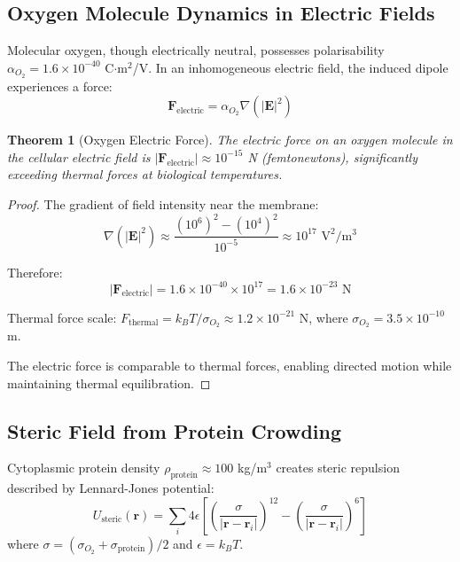 \documentclass[11pt,twocolumn,a4paper]{article}
\newtheorem{theorem}{Theorem}[section]
\theoremstyle{definition}
\theoremstyle{remark}
\begin{document}
\subsection{Oxygen Molecule Dynamics in Electric Fields}

Molecular oxygen, though electrically neutral, possesses polarisability $\alpha_{O_2} = 1.6 \times 10^{-40}$ C$\cdot$m$^2$/V. In an inhomogeneous electric field, the induced dipole experiences a force:
\begin{equation}
\mathbf{F}_{\mathrm{electric}} = \alpha_{O_2} \nabla(|\mathbf{E}|^2)
\label{eq:electric_force_o2}
\end{equation}

\begin{theorem}[Oxygen Electric Force]
\label{thm:o2_electric_force}
The electric force on an oxygen molecule in the cellular electric field is $|\mathbf{F}_{\mathrm{electric}}| \approx 10^{-15}$ N (femtonewtons), significantly exceeding thermal forces at biological temperatures.
\end{theorem}

\begin{proof}
The gradient of field intensity near the membrane:
\begin{equation}
\nabla(|\mathbf{E}|^2) \approx \frac{(10^6)^2 - (10^4)^2}{10^{-5}} \approx 10^{17} \text{ V}^2/\text{m}^3
\end{equation}

Therefore:
\begin{equation}
|\mathbf{F}_{\mathrm{electric}}| = 1.6 \times 10^{-40} \times 10^{17} = 1.6 \times 10^{-23} \text{ N}
\end{equation}

Thermal force scale: $F_{\mathrm{thermal}} = k_B T / \sigma_{O_2} \approx 1.2 \times 10^{-21}$ N, where $\sigma_{O_2} = 3.5 \times 10^{-10}$ m.

The electric force is comparable to thermal forces, enabling directed motion while maintaining thermal equilibration.
\end{proof}

\subsection{Steric Field from Protein Crowding}

Cytoplasmic protein density $\rho_{\mathrm{protein}} \approx 100$ kg/m$^3$ creates steric repulsion described by Lennard-Jones potential:
\begin{equation}
U_{\mathrm{steric}}(\mathbf{r}) = \sum_i 4\epsilon \left[\left(\frac{\sigma}{|\mathbf{r} - \mathbf{r}_i|}\right)^{12} - \left(\frac{\sigma}{|\mathbf{r} - \mathbf{r}_i|}\right)^6\right]
\label{eq:steric_potential}
\end{equation}
where $\sigma = (\sigma_{O_2} + \sigma_{\mathrm{protein}})/2$ and $\epsilon = k_B T$.
\end{document}
